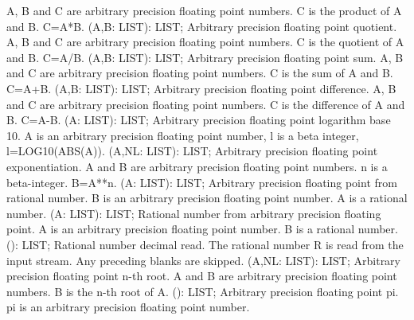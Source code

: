 A, B and C are arbitrary precision floating point numbers.
C is the product of A and B. C=A*B. \ecom 
{} (A,B: LIST): LIST; \eproc
\bcom Arbitrary precision floating point quotient.
A, B and C are arbitrary precision floating point numbers.
C is the quotient of A and B. C=A/B. \ecom 
{} (A,B: LIST): LIST; \eproc
\bcom Arbitrary precision floating point sum.
A, B and C are arbitrary precision floating point numbers.
C is the sum of A and B. C=A+B. \ecom 
{} (A,B: LIST): LIST; \eproc
\bcom Arbitrary precision floating point difference.
A, B and C are arbitrary precision floating point numbers.
C is the difference of A and B. C=A-B. \ecom 
{} (A: LIST): LIST; \eproc
\bcom Arbitrary precision floating point logarithm base 10.
A is an arbitrary precision floating point number,
l is a beta integer, l=LOG10(ABS(A)).  \ecom 
{} (A,NL: LIST): LIST; \eproc
\bcom Arbitrary precision floating point exponentiation.
A and B are arbitrary precision floating point numbers.
n is a beta-integer. B=A**n. \ecom 
{} (A: LIST): LIST; \eproc
\bcom Arbitrary precision floating point from rational number.
B is an arbitrary precision floating point number.
A is a rational number. \ecom 
{} (A: LIST): LIST; \eproc
\bcom Rational number from arbitrary precision floating point.
A is an arbitrary precision floating point number.
B is a rational number. \ecom 
{} (): LIST; \eproc
\bcom Rational number decimal read. The rational number R is read
from the input stream. Any preceding blanks are skipped. \ecom 
{} (A,NL: LIST): LIST; \eproc
\bcom Arbitrary precision floating point n-th root.
A and B are arbitrary precision floating point numbers.
B is the n-th root of A. \ecom 
{} (): LIST; \eproc
\bcom Arbitrary precision floating point pi.
pi is an arbitrary precision floating point number.  \ecom 
